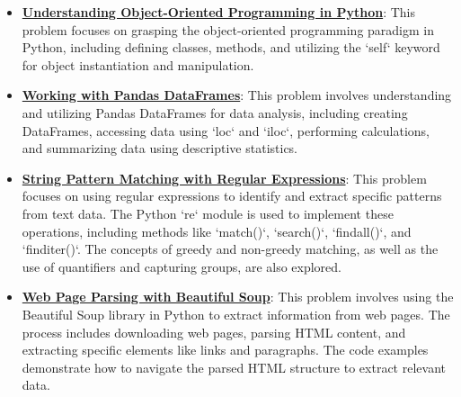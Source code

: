 \documentclass{article}%
\begin{document}
\begin{itemize}[leftmargin=*]
\item \href{https://purdue.brightspace.com/d2l/common/assets/pdfjs-d2l-dist/1.0.14-legacy/web/viewer.html?file=\%2Fcontent\%2Fenforced\%2F1095465-WL.202510.CS24200.LE1\%2F02L1-python.pdf\%3Fou\%3D1095465\&lang=en-us\&container=d2l-fileviewer-rendered-pdf\&fullscreen=d2l-fileviewer-rendered-pdf-dialog\&height=667#page=43}{\textbf{Understanding Object-Oriented Programming in Python}}: This problem focuses on grasping the object-oriented programming paradigm in Python, including defining classes, methods, and utilizing the `self` keyword for object instantiation and manipulation.%
\item \href{https://purdue.brightspace.com/d2l/common/assets/pdfjs-d2l-dist/1.0.14-legacy/web/viewer.html?file=\%2Fcontent\%2Fenforced\%2F1095465-WL.202510.CS24200.LE1\%2F04L1-data.pdf\%3Fou\%3D1095465\&lang=en-us\&container=d2l-fileviewer-rendered-pdf\&fullscreen=d2l-fileviewer-rendered-pdf-dialog\&height=667#page=17}{\textbf{Working with Pandas DataFrames}}: This problem involves understanding and utilizing Pandas DataFrames for data analysis, including creating DataFrames, accessing data using `loc` and `iloc`, performing calculations, and summarizing data using descriptive statistics.%
\item \href{https://purdue.brightspace.com/d2l/common/assets/pdfjs-d2l-dist/1.0.14-legacy/web/viewer.html?file=\%2Fcontent\%2Fenforced\%2F1095465-WL.202510.CS24200.LE1\%2F05L1-parsing.pdf\%3Fou\%3D1095465\&lang=en-us\&container=d2l-fileviewer-rendered-pdf\&fullscreen=d2l-fileviewer-rendered-pdf-dialog\&height=667#page=2}{\textbf{String Pattern Matching with Regular Expressions}}: This problem focuses on using regular expressions to identify and extract specific patterns from text data. The Python `re` module is used to implement these operations, including methods like `match()`, `search()`, `findall()`, and `finditer()`. The concepts of greedy and non-greedy matching, as well as the use of quantifiers and capturing groups, are also explored.%
\item \href{https://purdue.brightspace.com/d2l/common/assets/pdfjs-d2l-dist/1.0.14-legacy/web/viewer.html?file=\%2Fcontent\%2Fenforced\%2F1095465-WL.202510.CS24200.LE1\%2F05L1-parsing.pdf\%3Fou\%3D1095465\&lang=en-us\&container=d2l-fileviewer-rendered-pdf\&fullscreen=d2l-fileviewer-rendered-pdf-dialog\&height=667#page=16}{\textbf{Web Page Parsing with Beautiful Soup}}: This problem involves using the Beautiful Soup library in Python to extract information from web pages. The process includes downloading web pages, parsing HTML content, and extracting specific elements like links and paragraphs. The code examples demonstrate how to navigate the parsed HTML structure to extract relevant data.%

\end{itemize}
\end{document}
